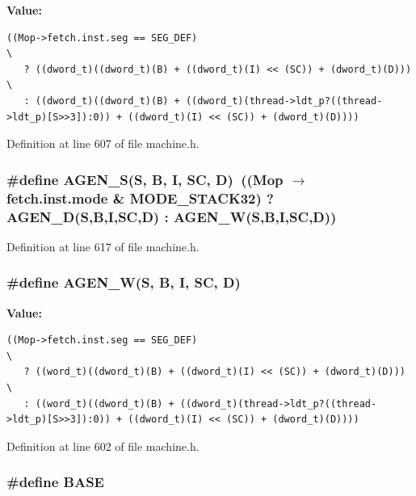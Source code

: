 \textbf{Value:}

\begin{Code}\begin{verbatim}((Mop->fetch.inst.seg == SEG_DEF)                                                  \
   ? ((dword_t)((dword_t)(B) + ((dword_t)(I) << (SC)) + (dword_t)(D)))        \
   : ((dword_t)((dword_t)(B) + ((dword_t)(thread->ldt_p?((thread->ldt_p)[S>>3]):0)) + ((dword_t)(I) << (SC)) + (dword_t)(D))))
\end{verbatim}
\end{Code}


Definition at line 607 of file machine.h.
\subsubsection[{AGEN\_\-S}]{\setlength{\rightskip}{0pt plus 5cm}\#define AGEN\_\-S(S, \/  B, \/  I, \/  SC, \/  D)~((Mop $\rightarrow$ fetch.inst.mode \& MODE\_\-STACK32) ? AGEN\_\-D(S,B,I,SC,D) : AGEN\_\-W(S,B,I,SC,D))}\label{machine_8h_bcc6658bfe3df71dd73cccde0800eba8}




Definition at line 617 of file machine.h.
\subsubsection[{AGEN\_\-W}]{\setlength{\rightskip}{0pt plus 5cm}\#define AGEN\_\-W(S, \/  B, \/  I, \/  SC, \/  D)}\label{machine_8h_558b7ddbbb0724ba22cdafd1d4c11136}


\textbf{Value:}

\begin{Code}\begin{verbatim}((Mop->fetch.inst.seg == SEG_DEF)                                                  \
   ? ((word_t)((dword_t)(B) + ((dword_t)(I) << (SC)) + (dword_t)(D)))        \
   : ((word_t)((dword_t)(B) + ((dword_t)(thread->ldt_p?((thread->ldt_p)[S>>3]):0)) + ((dword_t)(I) << (SC)) + (dword_t)(D))))
\end{verbatim}
\end{Code}


Definition at line 602 of file machine.h.
\subsubsection[{BASE}]{\setlength{\rightskip}{0pt plus 5cm}\#define BASE}\label{machine_8h_79bcfb6bde984f42d1124b068a509af7}



